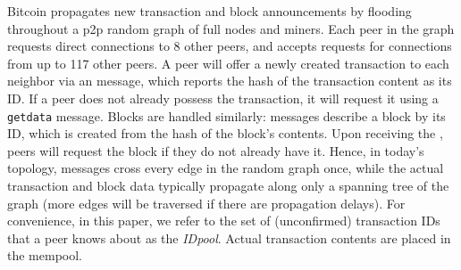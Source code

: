  Bitcoin propagates new transaction and
block announcements by flooding throughout a p2p random graph of full
nodes and miners. Each peer in the graph requests direct connections
to 8 other peers, and accepts requests for connections from up to 117
other peers. A peer will offer a newly created transaction to each
neighbor via an \inv message, which reports the hash of the
transaction content as its ID. If a peer does not already possess the
transaction, it will request it using a {\tt getdata} message. Blocks
are handled similarly: \inv messages describe a block by its ID, which
is created from the hash of the block's contents.  Upon receiving the
\inv, peers will request the block if they do not already have it.
Hence, in today's topology, \inv messages cross every edge in the
random graph once, while the actual transaction and block data
typically propagate along only a spanning tree of the graph (more
edges will be traversed if there are propagation delays).  For
convenience, in this paper, we refer to the set of (unconfirmed)
transaction IDs that a peer knows about as the {\em IDpool}. Actual
transaction contents are placed in the mempool.
